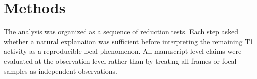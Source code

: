 \section{Methods}

The analysis was organized as a sequence of reduction tests. Each step asked
whether a natural explanation was sufficient before interpreting the remaining
T1 activity as a reproducible local phenomenon. All manuscript-level claims
were evaluated at the observation level rather than by treating all frames or
focal samples as independent observations.




